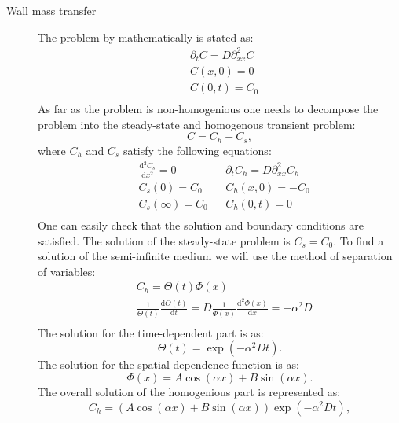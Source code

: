 \documentclass{article}
\begin{document}
\begin{description}
\item[Wall mass transfer] The problem by mathematically is stated as:
\begin{equation}
\begin{aligned}
&\partial_t C =D \partial^2_{xx} C\\
&C(x,0)=0\\
&C(0,t)=C_0\\
\end{aligned}
\end{equation}
As far as the problem is non-homogenious one needs to decompose the problem into the steady-state
and homogenous transient problem:
\begin{equation}
C=C_h + C_s,
\end{equation}
where $C_h$ and $C_s$ satisfy the following equations:
\begin{equation}
\begin{aligned}
&\frac{\mathrm{d^2} C_s}{\mathrm{d}x^2}=0 && \partial_t C_h=D\partial^2_{xx} C_h\\
&C_s(0)=C_0 && C_h(x,0)=-C_0\\
&C_s(\infty)=C_0 && C_h(0,t)=0\\
\end{aligned}
\end{equation}
One can easily check that the solution and boundary conditions are satisfied. The solution of
the steady-state problem is $C_s=C_0$. To find a solution of the semi-infinite medium we will use
the method of separation of variables:
\begin{equation}
\begin{aligned}
&C_h=\Theta(t)\Phi(x)\\
&\frac{1}{\Theta(t)}\frac{\mathrm{d}\Theta(t)}{\mathrm{d}t}=D
\frac{1}{\Phi(x)}\frac{\mathrm{d}^2\Phi(x)}{\mathrm{d}x}=-\alpha^2 D\\
\end{aligned}
\end{equation}
The solution for the time-dependent part is as:
\begin{equation}
\Theta(t)=\exp(-\alpha^2 D t).
\end{equation}
The solution for the spatial dependence function is as:
\begin{equation}
\Phi(x)=A\cos(\alpha x)+ B\sin(\alpha x).
\end{equation}
The overall solution of the homogenious part is represented as:
\begin{equation}
C_h=(A\cos(\alpha x) + B\sin(\alpha x)) \exp(-\alpha^2 D t),

\end{equation}
\end{description}
\end{document}
